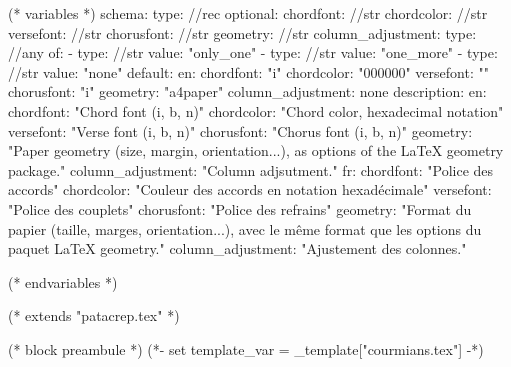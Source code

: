 %
%
%

(* variables *)
schema:
  type: //rec
  optional:
    chordfont: //str
    chordcolor: //str
    versefont: //str
    chorusfont: //str
    geometry: //str
    column_adjustment:
      type: //any
      of:
        - type: //str
          value: "only_one"
        - type: //str
          value: "one_more"
        - type: //str
          value: "none"
default:
  en:
    chordfont: "i"
    chordcolor: "000000"
    versefont: ""
    chorusfont: "i"
    geometry: "a4paper"
    column_adjustment: none
description:
  en:
    chordfont: "Chord font (i, b, n)"
    chordcolor: "Chord color, hexadecimal notation"
    versefont: "Verse font (i, b, n)"
    chorusfont: "Chorus font (i, b, n)"
    geometry: "Paper geometry (size, margin, orientation...), as options of the LaTeX geometry package."
    column_adjustment: "Column adjsutment."
  fr:
    chordfont: "Police des accords"
    chordcolor: "Couleur des accords en notation hexadécimale"
    versefont: "Police des couplets"
    chorusfont: "Police des refrains"
    geometry: "Format du papier (taille, marges, orientation...), avec le même format que les options du paquet LaTeX geometry."
    column_adjustment: "Ajustement des colonnes."


(* endvariables *)

(* extends "patacrep.tex" *)

(* block preambule *)
(*- set template_var = _template["courmians.tex"] -*)
\usepackage{licence}

\makeatletter
\renewcommand{\chorusfont}{%
   (* for letter in template_var.chorusfont *)
   (* if letter=="i" *)   \it %
   (* elif letter=='b' *)   \bf %
   (* elif letter=='n' *)   \normalfont %
   (* endif *)
   (* endfor *)
}

